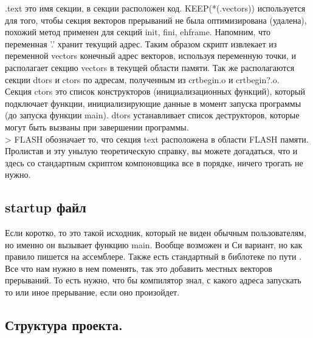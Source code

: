 \documentclass[12pt,a4paper]{article}
\begin{document}
    .text это имя секции, в секции расположен код. KEEP(*(.vectors)) используется
    для того, чтобы секция векторов прерываний не была оптимизирована (удалена),
    похожий метод применен для секций init, fini, eh\textunderscore frame. Напомним, что переменная
    '.' хранит текущий адрес. Таким образом скрипт извлекает из переменной vectors
    конечный адрес векторов, используя переменную точки, и располагает секцию
    vectors в текущей области памяти.
    Так же располагаются секции dtors и ctors по адресам,
    полученным из crtbegin.o и crtbegin?.o.\\
    Секция ctors это список конструкторов (инициализационных функций),
    который подключает функции, инициализирующие данные в момент запуска программы
    (до запуска функции main).
    dtors устанавливает список деструкторов, которые могут быть вызваны при
    завершении программы.\\
    > FLASH обозначает то, что секция text расположена в области FLASH памяти.\\
    Пролистав и эту унылую теоретическую справку, вы можете догадаться,
    что и здесь со стандартным скриптом компоновщика все в порядке,
    ничего трогать не нужно.
\subsection{startup файл}
    Если коротко, то это такой исходник, который не виден обычным пользователям,
    но именно он вызывает функцию main. Вообще возможен и Си вариант, но как
    правило пишется на ассемблере. Также есть стандартный в библотеке по пути
    .\\
    Все что нам нужно в нем поменять, так это добавить местных векторов
    прерываний. То есть нужно, что бы компилятор знал, с какого адреса запускать
    то или иное прерывание, если оно произойдет.

\subsection{Структура проекта.}
\end{document}
